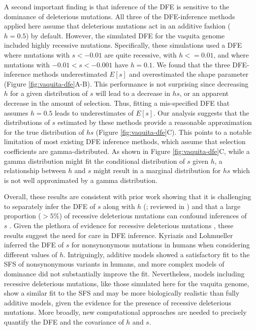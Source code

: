 \documentclass[hidelinks]{article}
\begin{document}
    A second important finding is that inference of the DFE
    is sensitive to the dominance of deleterious mutations.
    All three of the DFE-inference methods applied here assume that deleterious mutations act
    in an additive fashion ($h=0.5$) by default.
    However, the simulated DFE for the vaquita genome included highly recessive mutations.
    Specifically, these simulations used a DFE where mutations with $s<-0.01$ are quite recessive,
    with $h<=0.01$, and where mutations with $-0.01<s<-0.001$ have $h=0.1$.
    We found that the three DFE-inference methods underestimated $E[s]$ and overestimated the shape parameter (Figure \ref{fig:vaquita-dfe}A-B).
    This performance is not surprising since decreasing $h$ for a given distribution of $s$ will lead to a decrease in $hs$,
    or an apparent decrease in the amount of selection.
    Thus, fitting a mis-specified DFE that assumes $h=0.5$ leads to underestimates of $E[s]$. 
    Our analysis suggests that the distributions of $s$ estimated by these methods
    provide a reasonable approximation for the true distribution of $hs$ (Figure \ref{fig:vaquita-dfe}C).
    This points to a notable limitation of most existing DFE inference methods,
    which assume that selection coefficients are gamma-distributed.
    As shown in Figure \ref{fig:vaquita-dfe}C,
    while a gamma distribution might fit the conditional distribution of $s$ given $h$, a relationship between $h$ and $s$ might result in a marginal distribution for $hs$ which is not well approximated by a gamma distribution.
    
    Overall, these results are consistent with prior work showing that it is challenging to separately
    infer the DFE of $s$ along with $h$ (\textcite{wright1937distribution, veeramah2014evidence, simons2014deleterious, fuller2019measuring, balick2022overcoming, kyriazis2024constraining}; reviewed in \textcite{fuller2019measuring}) 
    and that a large proportion ($>5\%$) of recessive deleterious mutations can confound inferences of $s$ \citep{wade2023quantifying}.
    Given the plethora of evidence for recessive deleterious mutations
    \citep{mukai1972mutation, agrawal2011inferences, huber2018gene, di2024revisiting},
    these results suggest the need for care in DFE inference.
    Kyriazis and Lohmueller \citeyear{kyriazis2024constraining} inferred the DFE of $s$ for nonsynonymous mutations
    in humans when considering different values of $h$.
    Intriguingly, additive models showed a satisfactory fit to the SFS of nonsynonymous variants in humans,
    and more complex models of dominance did not substantially improve the fit.
    Nevertheless, models including recessive deleterious mutations, like those simulated here for the vaquita genome,
    show a similar fit to the SFS and may be more biologically realistic than fully additive models, 
    given the evidence for the presence of recessive deleterious mutations.
    More broadly, new computational approaches are needed to precisely quantify the DFE and the covariance of $h$ and $s$.
\end{document}
